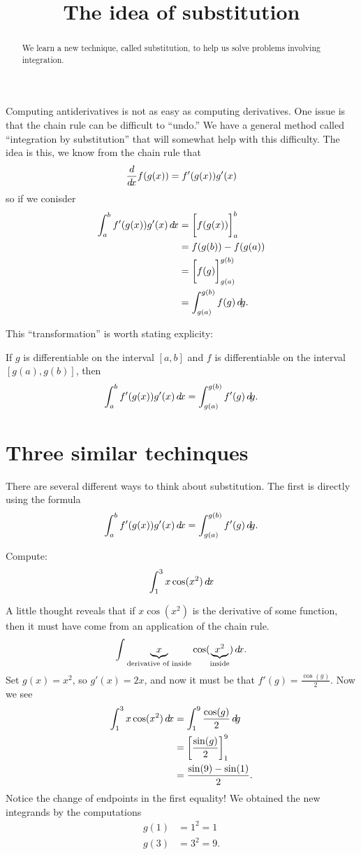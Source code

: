 \documentclass{ximera}
\title[Dig-In:]{The idea of substitution}
\begin{document}
\begin{abstract}
  We learn a new technique, called substitution, to help us solve
  problems involving integration.
\end{abstract}
\maketitle


Computing antiderivatives is not as easy as computing derivatives.
One issue is that the chain rule can be difficult to ``undo.''  We
have a general method called ``integration by substitution'' that will
somewhat help with this difficulty. The idea is this, we know from the
chain rule that
\[
\frac{d}{\mathop{}\!d\! x} f(g(x)) = f'(g(x))g'(x)
\]
so if we conisder
\begin{align*}
  \int_a^b f'(g(x))g'(x) \mathop{}\!d\! x &= \bigg[ f(g(x)) \bigg]_a^b \\
  &= f(g(b)) - f(g(a)) \\
  &= \bigg[ f(g) \bigg]_{g(a)}^{g(b)}\\
  &= \int_{g(a)}^{g(b)}f(g) \mathop{}\!d\! g.
\end{align*}

This ``transformation'' is worth stating explicity:

\begin{theorem} 
If $g$ is differentiable on the interval $[a,b]$ and $f$ is
differentiable on the interval $[g(a),g(b)]$, then
\[
\int_a^b f'(g(x)) g'(x) \mathop{}\!d\! x =\int_{g(a)}^{g(b)} f'(g) \mathop{}\!d\! g.
\]
\end{theorem}

\section{Three similar techinques}

There are several different ways to think about substitution. The
first is directly using the formula
\[
\int_a^b f'(g(x)) g'(x) \mathop{}\!d\! x = \int_{g(a)}^{g(b)} f'(g) \mathop{}\!d\! g.
\]
\begin{example}
Compute:
\[
\int_1^3 x\cos(x^2)\mathop{}\!d\! x
\]
\begin{explanation}
A little thought reveals that if $x\cos(x^2)$ is the derivative of
some function, then it must have come from an application of the chain
rule. 
\[
\int \underbrace{x}_{\text{derivative of inside}}\cos(\underbrace{x^2}_{\text{inside}})\mathop{}\!d\! x.
\]
Set $g(x) = x^2$, so $g'(x) = 2x$, and now it must be that $f'(g) =
\frac{\cos(g)}{2}$. Now we see
\begin{align*}
\int_1^3 x\cos(x^2)\mathop{}\!d\! x &= \int_1^9 \frac{\cos(g)}{2}\mathop{}\!d\! g\\
&= \bigg[ \frac{\sin(g)}{2} \bigg]_1^9 \\
&= \frac{\sin(9) -\sin(1)}{2}.
\end{align*}
Notice the change of endpoints in the first equality!  
We obtained the new integrands by the computations
\begin{align*}
g(1) &= 1^2 = 1  \\
g(3) &= 3^2 = 9.
\end{align*}
\end{explanation}
\end{example}
\end{document}
